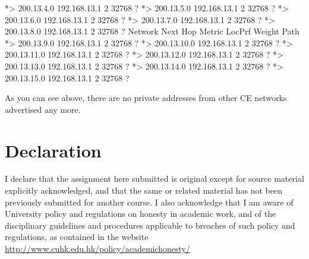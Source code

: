 \documentclass[10pt]{article}
\begin{document}
\begin{itemize}
\begin{verbatim*}
		*> 200.13.4.0       192.168.13.1             2         32768 ?
		*> 200.13.5.0       192.168.13.1             2         32768 ?
		*> 200.13.6.0       192.168.13.1             2         32768 ?
		*> 200.13.7.0       192.168.13.1             2         32768 ?
		*> 200.13.8.0       192.168.13.1             2         32768 ?
		   Network          Next Hop            Metric LocPrf Weight Path
		*> 200.13.9.0       192.168.13.1             2         32768 ?
		*> 200.13.10.0      192.168.13.1             2         32768 ?
		*> 200.13.11.0      192.168.13.1             2         32768 ?
		*> 200.13.12.0      192.168.13.1             2         32768 ?
		*> 200.13.13.0      192.168.13.1             2         32768 ?
		*> 200.13.14.0      192.168.13.1             2         32768 ?
		*> 200.13.15.0      192.168.13.1             2         32768 ?
	\end{verbatim*}
	As you can see above, there are no private addresses from other CE networks advertised any more.
\end{itemize}
\newpage
\appendix
\section{Declaration}
I declare that the assignment here submitted is original except for source material explicitly acknowledged, and that the same or related material has not been previously submitted for another course. I also acknowledge that I am aware of University policy and regulations on honesty in academic work, and of the disciplinary guidelines and procedures applicable to breaches of such policy and regulations, as contained in the website \url{http://www.cuhk.edu.hk/policy/academichonesty/}
\vspace*{3cm}
\end{document}
